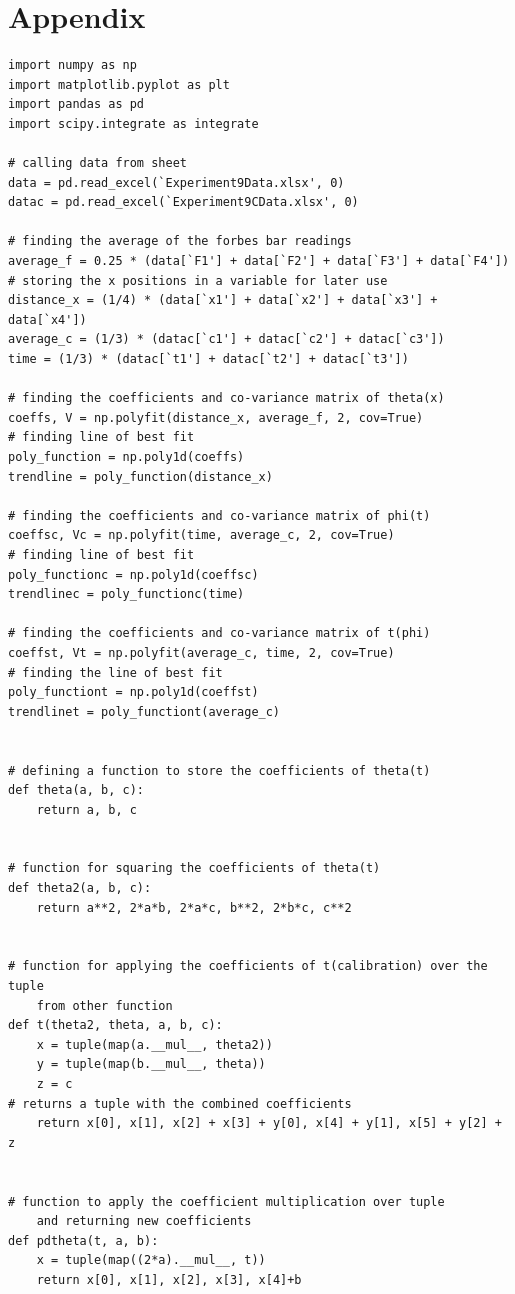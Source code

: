 \documentclass[12pt, a4paper]{article}
\begin{document}
\printbibliography[title = {References:}]

\section*{Appendix}
\begin{verbatim}
import numpy as np
import matplotlib.pyplot as plt
import pandas as pd
import scipy.integrate as integrate
 
# calling data from sheet
data = pd.read_excel(`Experiment9Data.xlsx', 0)
datac = pd.read_excel(`Experiment9CData.xlsx', 0)

# finding the average of the forbes bar readings
average_f = 0.25 * (data[`F1'] + data[`F2'] + data[`F3'] + data[`F4'])
# storing the x positions in a variable for later use
distance_x = (1/4) * (data[`x1'] + data[`x2'] + data[`x3'] + data[`x4'])
average_c = (1/3) * (datac[`c1'] + datac[`c2'] + datac[`c3'])
time = (1/3) * (datac[`t1'] + datac[`t2'] + datac[`t3'])
 
# finding the coefficients and co-variance matrix of theta(x)
coeffs, V = np.polyfit(distance_x, average_f, 2, cov=True)
# finding line of best fit
poly_function = np.poly1d(coeffs)
trendline = poly_function(distance_x)
 
# finding the coefficients and co-variance matrix of phi(t)
coeffsc, Vc = np.polyfit(time, average_c, 2, cov=True)
# finding line of best fit
poly_functionc = np.poly1d(coeffsc)
trendlinec = poly_functionc(time)
 
# finding the coefficients and co-variance matrix of t(phi)
coeffst, Vt = np.polyfit(average_c, time, 2, cov=True)
# finding the line of best fit
poly_functiont = np.poly1d(coeffst)
trendlinet = poly_functiont(average_c)
 
 
# defining a function to store the coefficients of theta(t)
def theta(a, b, c):
    return a, b, c
 
 
# function for squaring the coefficients of theta(t)
def theta2(a, b, c):
    return a**2, 2*a*b, 2*a*c, b**2, 2*b*c, c**2
 
 
# function for applying the coefficients of t(calibration) over the tuple
    from other function
def t(theta2, theta, a, b, c):
    x = tuple(map(a.__mul__, theta2))
    y = tuple(map(b.__mul__, theta))
    z = c
# returns a tuple with the combined coefficients 
    return x[0], x[1], x[2] + x[3] + y[0], x[4] + y[1], x[5] + y[2] + z
 
 
# function to apply the coefficient multiplication over tuple
    and returning new coefficients
def pdtheta(t, a, b):
    x = tuple(map((2*a).__mul__, t))
    return x[0], x[1], x[2], x[3], x[4]+b
 

\end{verbatim}
\end{document}

